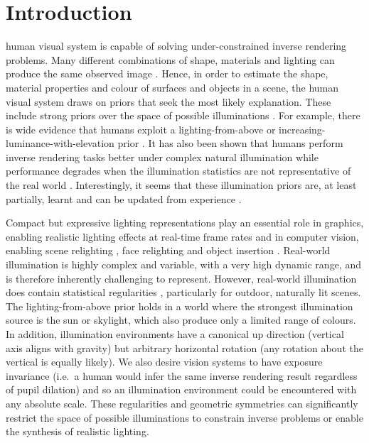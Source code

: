 \section{Introduction}

 human visual system is capable of solving under-constrained inverse rendering problems. Many different combinations of shape, materials and lighting can produce the same observed image \cite{belhumeur_bas-relief_1999}. Hence, in order to estimate the shape, material properties and colour of surfaces and objects in a scene, the human visual system draws on priors that seek the most likely explanation. These include strong priors over the space of possible illuminations \cite{murray2019visual}. For example, there is wide evidence that humans exploit a lighting-from-above or increasing-luminance-with-elevation prior \cite{hill_independent_1993, thomas_interactions_2010}. It has also been shown that humans perform inverse rendering tasks better under complex natural illumination while performance degrades when the illumination statistics are not representative of the real world \cite{fleming2003real}. Interestingly, it seems that these illumination priors are, at least partially, learnt \cite{granrud1985infants,thomas_interactions_2010} and can be updated from experience \cite{adams2004experience}.

Compact but expressive lighting representations play an essential role in graphics, enabling realistic lighting effects at real-time frame rates \cite{ramamoorthi_efficient_2001, tsai_all-frequency_2006, wang_all-frequency_2009, ng_all-frequency_2003, green_spherical_2003} and in computer vision, enabling scene relighting \cite{yu_outdoor_2021, yu_self-supervised_2020}, face relighting \cite{wang_face_2009, shu_neural_2017, egger_occlusion-aware_2018, sengupta_sfsnet_2018} and object insertion \cite{wang_learning_2021, song_neural_2019, li_inverse_2020}. Real-world illumination is highly complex and variable, with a very high dynamic range, and is therefore inherently challenging to represent. However, real-world illumination does contain statistical regularities \cite{dror_statistical_2004}, particularly for outdoor, naturally lit scenes. The lighting-from-above prior holds in a world where the strongest illumination source is the sun or skylight, which also produce only a limited range of colours. In addition, illumination environments have a canonical up direction (vertical axis aligns with gravity) but arbitrary horizontal rotation (any rotation about the vertical is equally likely). We also desire vision systems to have exposure invariance (i.e.~a human would infer the same inverse rendering result regardless of pupil dilation) and so an illumination environment could be encountered with any absolute scale. These regularities and geometric symmetries can significantly restrict the space of possible illuminations to constrain inverse problems or enable the synthesis of realistic lighting.

